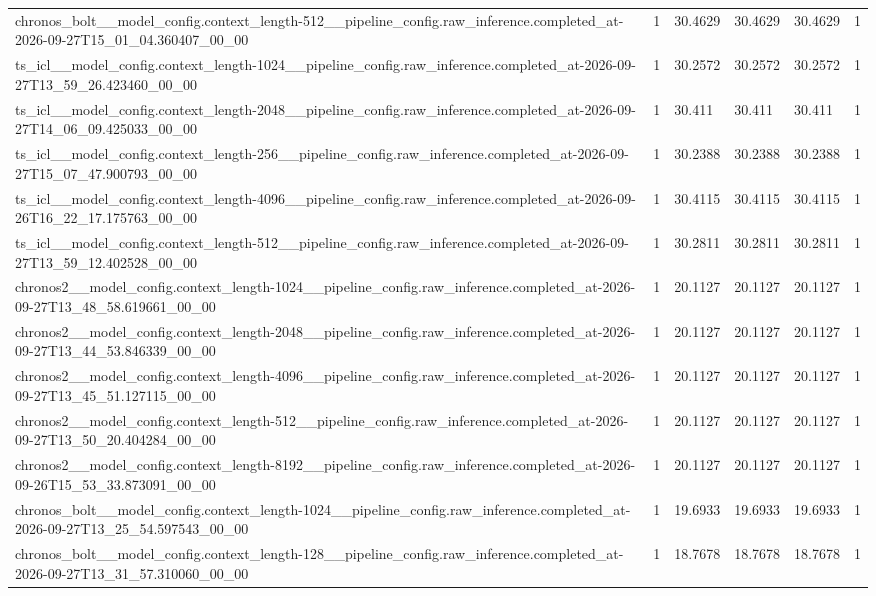 \begin{tabular}{llllll}
chronos\_bolt\_\_model\_config.context\_length-512\_\_pipeline\_config.raw\_inference.completed\_at-2026-09-27T15\_01\_04.360407\_00\_00 & 1 & 30.4629 & 30.4629 & 30.4629 & 1 \\
ts\_icl\_\_model\_config.context\_length-1024\_\_pipeline\_config.raw\_inference.completed\_at-2026-09-27T13\_59\_26.423460\_00\_00 & 1 & 30.2572 & 30.2572 & 30.2572 & 1 \\
ts\_icl\_\_model\_config.context\_length-2048\_\_pipeline\_config.raw\_inference.completed\_at-2026-09-27T14\_06\_09.425033\_00\_00 & 1 & 30.411 & 30.411 & 30.411 & 1 \\
ts\_icl\_\_model\_config.context\_length-256\_\_pipeline\_config.raw\_inference.completed\_at-2026-09-27T15\_07\_47.900793\_00\_00 & 1 & 30.2388 & 30.2388 & 30.2388 & 1 \\
ts\_icl\_\_model\_config.context\_length-4096\_\_pipeline\_config.raw\_inference.completed\_at-2026-09-26T16\_22\_17.175763\_00\_00 & 1 & 30.4115 & 30.4115 & 30.4115 & 1 \\
ts\_icl\_\_model\_config.context\_length-512\_\_pipeline\_config.raw\_inference.completed\_at-2026-09-27T13\_59\_12.402528\_00\_00 & 1 & 30.2811 & 30.2811 & 30.2811 & 1 \\
chronos2\_\_model\_config.context\_length-1024\_\_pipeline\_config.raw\_inference.completed\_at-2026-09-27T13\_48\_58.619661\_00\_00 & 1 & 20.1127 & 20.1127 & 20.1127 & 1 \\
chronos2\_\_model\_config.context\_length-2048\_\_pipeline\_config.raw\_inference.completed\_at-2026-09-27T13\_44\_53.846339\_00\_00 & 1 & 20.1127 & 20.1127 & 20.1127 & 1 \\
chronos2\_\_model\_config.context\_length-4096\_\_pipeline\_config.raw\_inference.completed\_at-2026-09-27T13\_45\_51.127115\_00\_00 & 1 & 20.1127 & 20.1127 & 20.1127 & 1 \\
chronos2\_\_model\_config.context\_length-512\_\_pipeline\_config.raw\_inference.completed\_at-2026-09-27T13\_50\_20.404284\_00\_00 & 1 & 20.1127 & 20.1127 & 20.1127 & 1 \\
chronos2\_\_model\_config.context\_length-8192\_\_pipeline\_config.raw\_inference.completed\_at-2026-09-26T15\_53\_33.873091\_00\_00 & 1 & 20.1127 & 20.1127 & 20.1127 & 1 \\
chronos\_bolt\_\_model\_config.context\_length-1024\_\_pipeline\_config.raw\_inference.completed\_at-2026-09-27T13\_25\_54.597543\_00\_00 & 1 & 19.6933 & 19.6933 & 19.6933 & 1 \\
chronos\_bolt\_\_model\_config.context\_length-128\_\_pipeline\_config.raw\_inference.completed\_at-2026-09-27T13\_31\_57.310060\_00\_00 & 1 & 18.7678 & 18.7678 & 18.7678 & 1 \\

\end{tabular}
